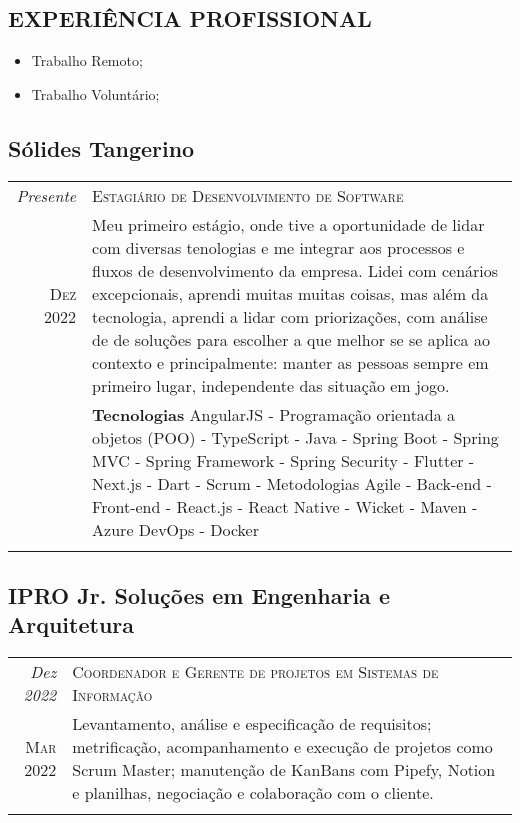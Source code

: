 \begin{framed}
\section{EXPERIÊNCIA PROFISSIONAL}
\begin{itemize}
  \item Trabalho Remoto;
  \item Trabalho Voluntário;

\end{itemize}

\subsection{  Sólides Tangerino}

\begin{tabular}{r|p{15cm}}
\emph{Presente}   & \textsc{Estagiário de Desenvolvimento de Software} \\
\textsc{Dez 2022} & \footnotesize{Meu primeiro estágio, onde tive a oportunidade de lidar com diversas tenologias e me integrar aos processos e fluxos de desenvolvimento da empresa. Lidei com cenários excepcionais, aprendi muitas muitas coisas, mas além da tecnologia, aprendi a lidar com priorizações, com análise de de soluções para escolher a que melhor se se aplica ao contexto e principalmente: manter as pessoas sempre em primeiro lugar, independente das situação em jogo.}\\
  & \footnotesize{
 \textbf{Tecnologias} 
 AngularJS - Programação orientada a objetos (POO) - TypeScript - Java - Spring Boot - Spring MVC - Spring Framework - Spring Security - Flutter - Next.js - Dart - Scrum - Metodologias Agile - Back-end - Front-end - React.js - React Native - Wicket - Maven - Azure DevOps - Docker}\\
\multicolumn{2}{c}{}
\end{tabular}


\subsection{  IPRO Jr. Soluções em Engenharia e Arquitetura}

\begin{tabular}{r|p{15cm}}
\emph{Dez 2022}   & \textsc{Coordenador e Gerente de projetos em Sistemas de Informação }\\
\textsc{Mar 2022} & \footnotesize{Levantamento, análise e especificação de requisitos; metrificação, acompanhamento e execução de projetos como Scrum Master; manutenção de KanBans com Pipefy, Notion e planilhas, negociação e colaboração com o cliente.}\\
\multicolumn{2}{c}{}\\


\end{tabular}
\end{framed}
